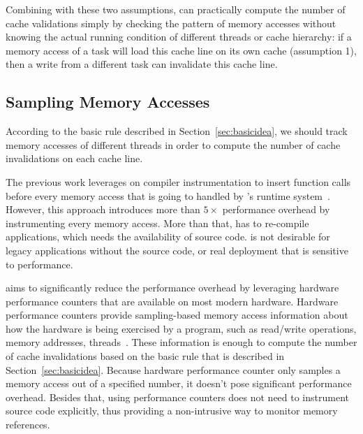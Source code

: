 Combining with these two assumptions, \cheetah{} can practically compute the number of cache validations simply by checking the pattern of memory accesses without knowing the actual running condition of different threads or cache hierarchy: if a memory access of a task will load this cache line on its own cache (assumption 1), then a write from a different task can invalidate this cache line. 

 


\subsection{Sampling Memory Accesses}
\label{sec:perfcounter}

According to the basic rule described in Section~\ref{sec:basicidea}, we should track memory accesses of different threads in order to compute the number of cache invalidations on each cache line. 

The previous work \Predator{} leverages on compiler instrumentation to insert function calls before every memory access that is going to handled by \Predator{}'s runtime system~\cite{Predator}. However, this approach introduces more than $5\times$ performance overhead by instrumenting every memory access. More than that, \Predator{} has to re-compile applications, which needs the availability of source code. \Predator{} is not desirable for legacy applications without the source code, or real deployment that is sensitive to performance. 

\cheetah{} aims to significantly reduce the performance overhead by leveraging hardware performance counters that are available on most modern hardware. Hardware performance counters provide sampling-based memory access information about how the hardware is being exercised by a program, such as read/write operations, memory addresses, threads~\cite{Mucci99papi}. These information is enough to compute the number of cache invalidations based on the basic rule that is described in Section~\ref{sec:basicidea}. Because hardware performance counter only samples a memory access out of a specified number, it doesn't pose significant performance overhead. 
Besides that, using performance counters does not need to instrument source code explicitly, thus providing a non-intrusive way to monitor memory references. 

